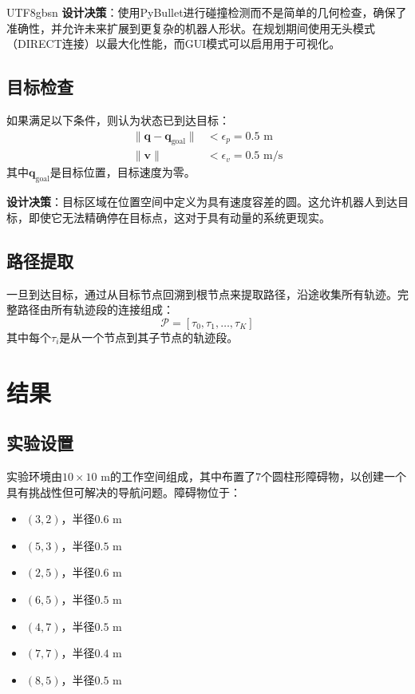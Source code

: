 \documentclass[11pt]{article}
\begin{document}
\begin{CJK}{UTF8}{gbsn}
\textbf{设计决策}：使用PyBullet进行碰撞检测而不是简单的几何检查，确保了准确性，并允许未来扩展到更复杂的机器人形状。在规划期间使用无头模式（DIRECT连接）以最大化性能，而GUI模式可以启用用于可视化。

\subsection{目标检查}

如果满足以下条件，则认为状态已到达目标：
\begin{align}
\|\mathbf{q} - \mathbf{q}_{\text{goal}}\| &< \epsilon_p = 0.5 \text{ m} \\
\|\mathbf{v}\| &< \epsilon_v = 0.5 \text{ m/s}
\end{align}
其中$\mathbf{q}_{\text{goal}}$是目标位置，目标速度为零。

\textbf{设计决策}：目标区域在位置空间中定义为具有速度容差的圆。这允许机器人到达目标，即使它无法精确停在目标点，这对于具有动量的系统更现实。

\subsection{路径提取}

一旦到达目标，通过从目标节点回溯到根节点来提取路径，沿途收集所有轨迹。完整路径由所有轨迹段的连接组成：
\begin{equation}
\mathcal{P} = [\tau_0, \tau_1, \ldots, \tau_K]
\end{equation}
其中每个$\tau_i$是从一个节点到其子节点的轨迹段。

\section{结果}

\subsection{实验设置}

实验环境由$10 \times 10$ m的工作空间组成，其中布置了7个圆柱形障碍物，以创建一个具有挑战性但可解决的导航问题。障碍物位于：
\begin{itemize}
    \item $(3, 2)$，半径$0.6$ m
    \item $(5, 3)$，半径$0.5$ m
    \item $(2, 5)$，半径$0.6$ m
    \item $(6, 5)$，半径$0.5$ m
    \item $(4, 7)$，半径$0.5$ m
    \item $(7, 7)$，半径$0.4$ m
    \item $(8, 5)$，半径$0.5$ m
\end{itemize}


\end{CJK}
\end{document}
